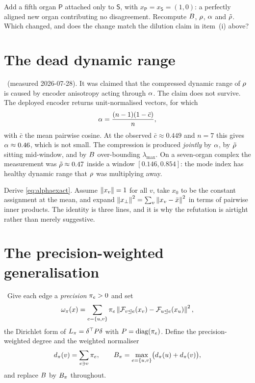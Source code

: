 \begin{exercise}
Add a fifth organ $\mathsf{P}$ attached only to $\mathsf{S}$, with
$x_{\mathsf P}=x_{\mathsf S}=(1,0)$: a perfectly aligned new organ
contributing no disagreement. Recompute $B$, $\rho$, $\alpha$
and $\tilde{\rho}$. Which changed, and does the change match the dilution
claim in item~(i) above?
\end{exercise}

\section{The dead dynamic range}\label{sec:deadrange}

\begin{hon}\Hon
\Refuted\ (measured 2026-07-28). It was claimed that the compressed
dynamic range of $\rho$ is caused by encoder anisotropy acting
through $\alpha$. The claim does not survive. The deployed encoder
returns unit-normalised vectors, for which
\begin{equation}\label{eq:alphaexact}
  \alpha=\frac{(n-1)(1-\bar c)}{n},
\end{equation}
with $\bar c$ the mean pairwise cosine. At the observed
$\bar c\approx0.449$ and $n=7$ this gives $\alpha\approx0.46$, which
is not small. The compression is produced \emph{jointly} by $\alpha$,
by $\tilde{\rho}$ sitting mid-window, and by $B$ over-bounding
$\lambda_{\max}$. On a seven-organ complex the measurement was
$\tilde{\rho}\approx0.47$ inside a window $[0.146,0.854]$: the mode index has
healthy dynamic range that $\rho$ was multiplying away.
\end{hon}

\begin{exercise}
Derive \eqref{eq:alphaexact}. Assume $\left\lVert x_v \right\rVert=1$ for all $v$, take
$x_0$ to be the constant assignment at the mean, and expand
$\left\lVert x_\perp \right\rVert^2=\sum_v\left\lVert x_v-\bar x \right\rVert^2$ in terms of pairwise inner
products. The identity is three lines, and it is why the refutation is
airtight rather than merely suggestive.
\end{exercise}

\section{The precision-weighted generalisation}

\begin{construction}\label{con:weighted}
\Implemented\ Give each edge a \emph{precision} $\pi_e>0$ and set
\begin{equation}\label{eq:weighteddiscord}
  \omega_\pi(x)=\sum_{e=\{u,v\}}\pi_e
  \left\lVert \mathcal{F}_{v\trianglelefteq e}(x_v)-\mathcal{F}_{u\trianglelefteq e}(x_u) \right\rVert^2 ,
\end{equation}
the Dirichlet form of $L_\pi=\delta^\top P\delta$ with
$P=\operatorname{diag}(\pi_e)$. Define the precision-weighted degree and the
weighted normaliser
\[
  d_\pi(v)=\sum_{e\ni v}\pi_e,
  \qquad
  B_\pi=\max_{e=\{u,v\}}\bigl(d_\pi(u)+d_\pi(v)\bigr),
\]
and replace $B$ by $B_\pi$ throughout.
\end{construction}

